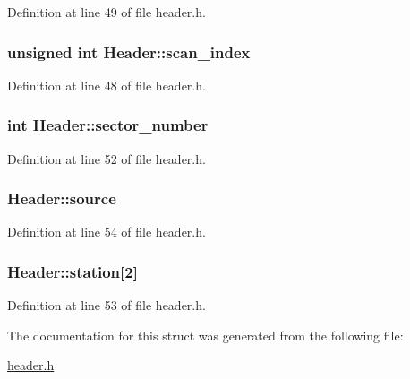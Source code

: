 Definition at line 49 of file header.h.\hypertarget{structHeader_a43071722fb67652bad41c74b62163daa}{
\subsubsection[{scan\_\-index}]{\setlength{\rightskip}{0pt plus 5cm}unsigned int {\bf Header::scan\_\-index}}}
\label{structHeader_a43071722fb67652bad41c74b62163daa}


Definition at line 48 of file header.h.\hypertarget{structHeader_ade22c8b450e0ecfece5cca1daf8a91ea}{
\subsubsection[{sector\_\-number}]{\setlength{\rightskip}{0pt plus 5cm}int {\bf Header::sector\_\-number}}}
\label{structHeader_ade22c8b450e0ecfece5cca1daf8a91ea}


Definition at line 52 of file header.h.\hypertarget{structHeader_aecdafddd43ad4d9cd45e2b0140d1b723}{
\subsubsection[{source}]{ {\bf Header::source}}}
\label{structHeader_aecdafddd43ad4d9cd45e2b0140d1b723}


Definition at line 54 of file header.h.\hypertarget{structHeader_a93e7c152ec198fa6c419fe809cb674f6}{
\subsubsection[{station}]{ {\bf Header::station}\mbox{[}2\mbox{]}}}
\label{structHeader_a93e7c152ec198fa6c419fe809cb674f6}


Definition at line 53 of file header.h.

The documentation for this struct was generated from the following file:\begin{DoxyCompactItemize}
\item 
\hyperlink{header_8h}{header.h}\end{DoxyCompactItemize}
